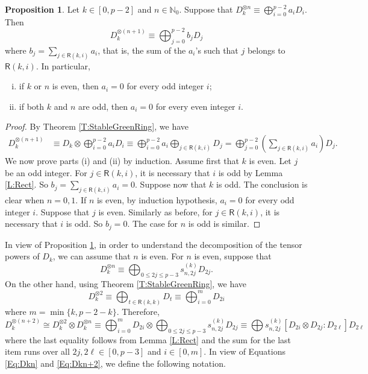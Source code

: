 \documentclass[12pt,reqno]{amsart}
\newcommand{\NN}{\mathbb{N}}
\newcommand{\Rect}{\mathsf{R}}
\renewcommand{\leq}{\leqslant}
\theoremstyle{definition}
\newtheorem{prop}[thm]{Proposition}
\numberwithin{equation}{section}
\begin{document}
\begin{prop}\label{P:reduction} Let $k\in [0,p-2]$ and $n\in\NN_0$. Suppose that $D^{\otimes n}_k\equiv \bigoplus_{i=0}^{p-2}a_iD_i$. Then \[D^{\otimes (n+1)}_k
\equiv \bigoplus_{j=0}^{p-2}b_j D_j\] where $b_j=\sum_{j\in\Rect(k,i)} a_i$, that is, the sum of the $a_i$'s such that $j$ belongs to $\Rect(k,i)$. In particular, 
\begin{enumerate}[(i)]
    \item if $k$ or $n$ is even, then $a_i=0$ for every odd integer $i$;
    \item if both $k$ and $n$ are odd, then $a_i=0$ for every even integer $i$. 
\end{enumerate}
\end{prop}
\begin{proof}
    By Theorem \ref{T:StableGreenRing}, we have 
    \begin{align*}
        D^{\otimes (n+1)}_k&\equiv D_k\otimes \bigoplus_{i=0}^{p-2}a_iD_i\equiv \bigoplus_{i=0}^{p-2}a_i\bigoplus_{j\in\Rect(k,i)}D_j=\bigoplus_{j=0}^{p-2}\left (\sum_{j\in\Rect(k,i)} a_i\right ) D_j.
    \end{align*} We now prove parts (i) and (ii) by induction. Assume first that $k$ is even. Let $j$ be an odd integer. For $j\in \Rect(k,i)$, it is necessary that $i$ is odd by Lemma \ref{L:Rect}. So $b_j=\sum_{j\in\Rect(k,i)} a_i=0$. Suppose now that $k$ is odd. The conclusion is clear when $n=0,1$. If $n$ is even, by induction hypothesis, $a_i=0$ for every odd integer $i$. Suppose that $j$ is even. Similarly as before, for $j\in \Rect(k,i)$, it is necessary that $i$ is odd. So $b_j=0$. The case for $n$ is odd is similar. 
\end{proof}

In view of Proposition \ref{P:reduction}, in order to understand the decomposition of the tensor powers of $D_k$, we can assume that $n$ is even. For $n$ is even, suppose that 
\begin{equation}\label{Eq:Dkn}
D_k^{\otimes n}\equiv \bigoplus_{0\leq 2j\leq p-3}s_{n,2j}^{(k)}D_{2j}.
\end{equation} On the other hand, using Theorem \ref{T:StableGreenRing}, we have \[D_k^{\otimes 2}\equiv \bigoplus_{t\in\Rect(k,k)} D_t\equiv \bigoplus_{i=0}^m D_{2i}\] where $m=\min\{k,p-2-k\}$. Therefore,  
\begin{equation}\label{Eq:Dkn+2} D_k^{\otimes (n+2)}\cong D_k^{\otimes 2}\otimes D_k^{\otimes n}\equiv \bigoplus_{i=0}^mD_{2i}\otimes \bigoplus_{0\leq 2j\leq p-3}s_{n,2j}^{(k)}D_{2j}\equiv \bigoplus s_{n,2j}^{(k)} [D_{2i}\otimes D_{2j}:D_{2\ell}]D_{2\ell}
\end{equation} where the last equality follows from Lemma \ref{L:Rect} and the sum for the last item runs over all $2j,2\ell\in [0,p-3]$ and $i\in [0,m]$. In view of Equations \ref{Eq:Dkn} and \ref{Eq:Dkn+2}, we define the following notation. 
\end{document}
